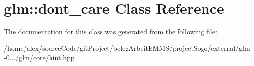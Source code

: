 \hypertarget{classglm_1_1dont__care}{\section{glm\-:\-:dont\-\_\-care Class Reference}
\label{classglm_1_1dont__care}
}


The documentation for this class was generated from the following file\-:\begin{DoxyCompactItemize}
\item 
/home/alex/source\-Code/git\-Project/beleg\-Arbeit\-E\-M\-M\-S/project\-Sogo/external/glm-\/0.../glm/core/\hyperlink{hint_8hpp}{hint.\-hpp}\end{DoxyCompactItemize}
